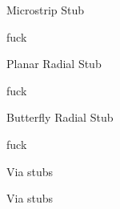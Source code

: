 \begin{frame}{Microstrip Stub}
    \begin{twocolumns}[0.5]
        \leftcol
            \vspace{-30pt}
        \rightcol
            fuck
    \end{twocolumns}
\end{frame}

\begin{frame}{Planar Radial Stub}
    \begin{twocolumns}[0.5]
        \leftcol
            \vspace{-30pt}
        \rightcol
            fuck
    \end{twocolumns}
\end{frame}

\begin{frame}{Butterfly Radial Stub}
    \begin{twocolumns}[0.5]
        \leftcol
            \vspace{-30pt}
        \rightcol
            fuck
    \end{twocolumns}
\end{frame}

\begin{frame}{Via stubs}
\end{frame}

\begin{frame}{Via stubs}
    \vspace{-40pt}
\end{frame}








